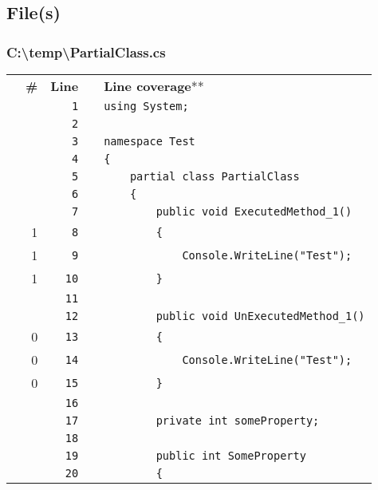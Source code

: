 \documentclass[a4paper,landscape,10pt]{article}
\begin{document}
\subsection{File(s)}
\subsubsection{C:\textbackslash temp\textbackslash PartialClass.cs}
\begin{longtable}[l]{lrrll}
 & \textbf{\#} & \textbf{Line} & & \textbf{Line coverage}** \\
\cellcolor{gray} &  & \verb~1~ & & \verb~using System;~\\
\cellcolor{gray} &  & \verb~2~ & & \verb~~\\
\cellcolor{gray} &  & \verb~3~ & & \verb~namespace Test~\\
\cellcolor{gray} &  & \verb~4~ & & \verb~{~\\
\cellcolor{gray} &  & \verb~5~ & & \verb~    partial class PartialClass~\\
\cellcolor{gray} &  & \verb~6~ & & \verb~    {~\\
\cellcolor{gray} &  & \verb~7~ & & \verb~        public void ExecutedMethod_1()~\\
\cellcolor{green} & 1 & \verb~8~ & & \verb~        {~\\
\cellcolor{green} & 1 & \verb~9~ & & \verb~            Console.WriteLine("Test");~\\
\cellcolor{green} & 1 & \verb~10~ & & \verb~        }~\\
\cellcolor{gray} &  & \verb~11~ & & \verb~~\\
\cellcolor{gray} &  & \verb~12~ & & \verb~        public void UnExecutedMethod_1()~\\
\cellcolor{red} & 0 & \verb~13~ & & \verb~        {~\\
\cellcolor{red} & 0 & \verb~14~ & & \verb~            Console.WriteLine("Test");~\\
\cellcolor{red} & 0 & \verb~15~ & & \verb~        }~\\
\cellcolor{gray} &  & \verb~16~ & & \verb~~\\
\cellcolor{gray} &  & \verb~17~ & & \verb~        private int someProperty;~\\
\cellcolor{gray} &  & \verb~18~ & & \verb~~\\
\cellcolor{gray} &  & \verb~19~ & & \verb~        public int SomeProperty~\\
\cellcolor{gray} &  & \verb~20~ & & \verb~        {~\\

\end{longtable}
\end{document}
